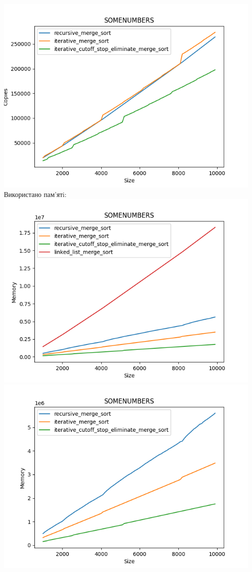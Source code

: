 \documentclass{article}
\begin{document}
            \includegraphics[scale=0.5]{somenumbers_Copies_3_sorts_90_numbers_50.png}
        \newline
        Використано пам’ятi:
        \newline
            \includegraphics[scale=0.5]{somenumbers_Memory_4_sorts_90_numbers_50.png}
            \includegraphics[scale=0.5]{somenumbers_Memory_3_sorts_90_numbers_50.png}
        \newpage
\end{document}
